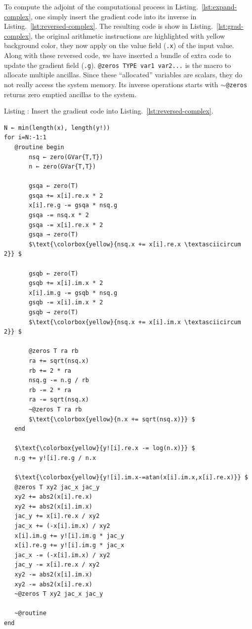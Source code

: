 \documentclass{article}
\newcommand{\listingcaption}[1]%
{%
\refstepcounter{lstlisting}\hfill%
Listing \thelstlisting: #1\hfill%
}%
\newcommand{\<}{\langle}
\renewcommand{\>}{\rangle}
\newcommand{\Lst}[1]{Listing.~\ref{#1}}
\theoremstyle{definition}\newtheorem{definition}{\textit{Definition}}
\begin{document}
To compute the adjoint of the computational process in \Lst{lst:expand-complex}, one simply insert the gradient code into its inverse in \Lst{lst:reversed-complex}.
The resulting code is show in \Lst{lst:grad-complex}, the original arithmetic instructions are highlighted with yellow background color, they now apply on the value field (\texttt{.x}) of the input value.
Along with these reversed code, we have inserted a bundle of extra code to update the gradient field (\texttt{.g}). \texttt{@zeros TYPE var1 var2...} is the macro to allocate multiple ancillas. Since these ``allocated'' variables are scalars, they do not really access the system memory. Its inverse operations starts with \texttt{$\sim$@zeros} returns zero emptied ancillas to the system.

\begin{minipage}{.88\columnwidth}
    \listingcaption{Insert the gradient code into \Lst{lst:reversed-complex}.}\label{lst:grad-complex}
    \begin{lstlisting}[mathescape=true,label={lst:grad-complex}, multicols=2]
N ← min(length(x), length(y!))
for i=N:-1:1
   @routine begin
       nsq ← zero(GVar{T,T})
       n ← zero(GVar{T,T})

       gsqa ← zero(T)
       gsqa += x[i].re.x * 2
       x[i].re.g -= gsqa * nsq.g
       gsqa -= nsq.x * 2
       gsqa -= x[i].re.x * 2
       gsqa → zero(T)
       $\text{\colorbox{yellow}{nsq.x += x[i].re.x \textasciicircum 2}} $

       gsqb ← zero(T)
       gsqb += x[i].im.x * 2
       x[i].im.g -= gsqb * nsq.g
       gsqb -= x[i].im.x * 2
       gsqb → zero(T)
       $\text{\colorbox{yellow}{nsq.x += x[i].im.x \textasciicircum 2}} $

       @zeros T ra rb
       ra += sqrt(nsq.x)
       rb += 2 * ra
       nsq.g -= n.g / rb
       rb -= 2 * ra
       ra -= sqrt(nsq.x)
       ~@zeros T ra rb
       $\text{\colorbox{yellow}{n.x += sqrt(nsq.x)}} $
   end

   $\text{\colorbox{yellow}{y![i].re.x -= log(n.x)}} $
   n.g += y![i].re.g / n.x

   $\text{\colorbox{yellow}{y![i].im.x-=atan(x[i].im.x,x[i].re.x)}} $
   @zeros T xy2 jac_x jac_y
   xy2 += abs2(x[i].re.x)
   xy2 += abs2(x[i].im.x)
   jac_y += x[i].re.x / xy2
   jac_x += (-x[i].im.x) / xy2
   x[i].im.g += y![i].im.g * jac_y
   x[i].re.g += y![i].im.g * jac_x
   jac_x -= (-x[i].im.x) / xy2
   jac_y -= x[i].re.x / xy2
   xy2 -= abs2(x[i].im.x)
   xy2 -= abs2(x[i].re.x)
   ~@zeros T xy2 jac_x jac_y

   ~@routine
end
\end{lstlisting}
\end{minipage}
\end{document}
